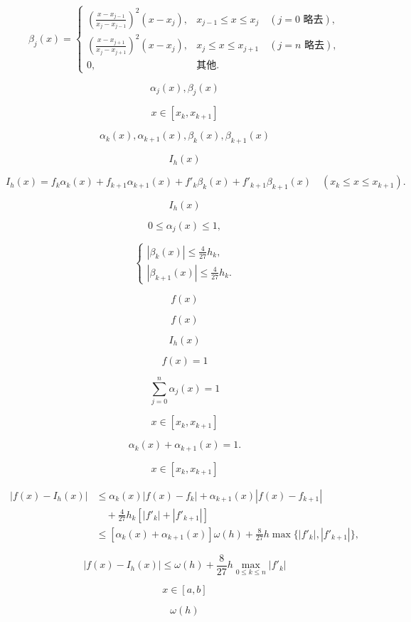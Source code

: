 \documentclass[fontset=fandol]{ctexart}
\begin{document}
\[\beta_j(x)=\begin{cases}
\displaystyle\left(\frac{x-x_{j-1}}{x_j-x_{j-1}}\right)^2(x-x_j),&x_{j-1}\leqslant x\leqslant x_j\quad(j=0\text{ 略去}),\\[6pt]
\displaystyle\left(\frac{x-x_{j+1}}{x_j-x_{j+1}}\right)^2(x-x_j),&x_j\leqslant x\leqslant x_{j+1}\quad(j=n\text{ 略去}),\\[6pt]
0,&\text{其他}.
\end{cases}\tag{2.7.8}\]

\[\alpha_j(x),\beta_j(x)\]

\[x\in[x_k,x_{k+1}]\]

\[\alpha_k(x),\alpha_{k+1}(x),\beta_k(x),\beta_{k+1}(x)\]

\[I_h(x)\]

\[I_h(x)=f_k\alpha_k(x)+f_{k+1}\alpha_{k+1}(x)+f'_k\beta_k(x)+f'_{k+1}\beta_{k+1}(x)\quad(x_k\leqslant x\leqslant x_{k+1}).\tag{2.7.9}\]

\[I_h(x)\]

\[0\leqslant\alpha_j(x)\leqslant1,\tag{2.7.10}\]

\[\begin{cases}
\displaystyle|\beta_k(x)|\leqslant\frac{4}{27}h_k,\\[6pt]
\displaystyle|\beta_{k+1}(x)|\leqslant\frac{4}{27}h_k.
\end{cases}\tag{2.7.11}\]

\[f(x)\]

\[f(x)\]

\[I_h(x)\]

\[f(x)=1\]

\[\sum_{j=0}^n\alpha_j(x)=1\]

\[x\in[x_k,x_{k+1}]\]

\[\alpha_k(x)+\alpha_{k+1}(x)=1.\tag{2.7.12}\]

\[x\in[x_k,x_{k+1}]\]

\[\begin{aligned}
|f(x)-I_h(x)|&\leqslant\alpha_k(x)|f(x)-f_k|+\alpha_{k+1}(x)|f(x)-f_{k+1}|\\
&\quad+\frac{4}{27}h_k[|f'_k|+|f'_{k+1}|]\\
&\leqslant[\alpha_k(x)+\alpha_{k+1}(x)]\omega(h)+\frac{8}{27}h\max\{|f'_k|,|f'_{k+1}|\},
\end{aligned}\]

\[|f(x)-I_h(x)|\leqslant\omega(h)+\frac{8}{27}h\max_{0\leqslant k\leqslant n}|f'_k|\tag{2.7.13}\]

\[x\in[a,b]\]

\[\omega(h)\]
\end{document}

